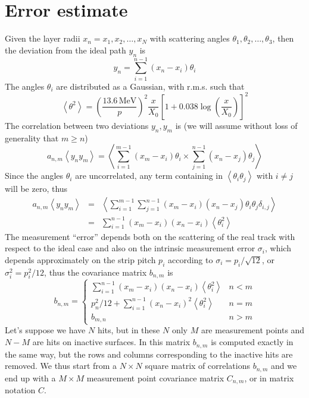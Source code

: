 \documentclass[10pt,a4paper]{article}
\begin{document}
\section{Error estimate}
Given the layer radii $x_n = x_1, x_2, \ldots, x_N$ with scattering
angles $\theta_1, \theta_2, \ldots, \theta_3$, then the deviation from
the ideal path $y_n$ is
\begin{equation}
  y_n=\sum_{i=1}^{n-1} \left (  x_n - x_i \right ) \theta_i
\end{equation}
The angles $\theta_i$ are distributed as a Gaussian, with r.m.s. such
that
\begin{equation}
  \left < \theta^2 \right > =
  \left ( \frac {13.6\,\mathrm{MeV}} {p} \right )^2
  \frac x {X_0}
  \left [ 1+ 0.038 \log \left ( \frac x {X_0} \right ) \right ] ^2
\end{equation}
The correlation between two deviations $y_n, y_m$ is (we will assume
without loss of generality that $m \geq n$)
\begin{equation}
  a_{n,m}\left < y_n y_m \right > =
  \left <
    \sum_{i=1}^{m-1} \left (  x_m - x_i \right ) \theta_i
    \times
    \sum_{j=1}^{n-1} \left (  x_n - x_j \right ) \theta_j
  \right >
\end{equation}
Since the angles $\theta_i$ are uncorrelated, any term containing in
$\left < \theta_i \theta_j \right >$ with $i\neq j$ will be zero, thus
\begin{eqnarray}
  a_{n,m}\left < y_n y_m \right > & = &
  \left <
    \sum_{i=1}^{m-1} \sum_{j=1}^{n-1}
    \left (  x_m - x_i \right )
    \left (  x_n - x_j \right ) \theta_i \theta_j \delta_{i,j}
  \right > \nonumber \\
  & = &
  \sum_{i=1}^{n-1} 
  \left (  x_m - x_i \right )
  \left (  x_n - x_i \right )  \left < \theta_i^2 \right > 
\end{eqnarray}
The measurement ``error'' depends both on the scattering of the real
track with respect to the ideal case and also on the intrinsic
measurement error $\sigma_i$, which depends approximately on the strip
pitch $p_i$ according to $\sigma_i = p_i / \sqrt{12}$, or $\sigma_i^2
= p_i^2 / 12$, thus the covariance matrix $b_{n,m}$ is
\begin{equation}
  b_{n,m}= \left \{
\begin{array}{cl}
  \sum_{i=1}^{n-1} \left (  x_m - x_i \right ) \left (  x_n - x_i \right )  \left < \theta_i^2 \right > & n<m \\
  p_n^2 / 12 + \sum_{i=1}^{n-1} \left (  x_n - x_i \right )^2  \left < \theta_i^2 \right > & n=m \\
  b_{m,n}  & n>m
\end{array}
\right .
\end{equation}
Let's suppose we have $N$ hits, but in these $N$ only $M$ are
measurement points and $N-M$ are hits on inactive surfaces. In this
matrix $b_{n,m}$ is computed exactly in the same way, but the rows and
columns corresponding to the inactive hits are removed. We thus start
from a $N\times N$ square matrix of correlations $b_{n,m}$ and we end
up with a $M\times M$ measurement point covariance matrix $C_{n,m}$,
or in matrix notation $C$.


\label{LastPage}
\end{document}
